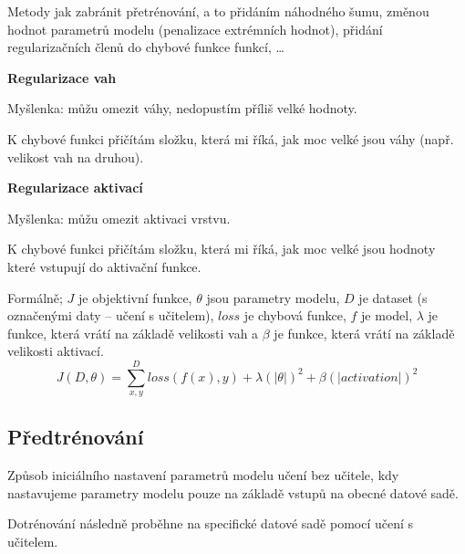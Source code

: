 \begin{compactitem}
    \item Metody jak zabránit přetrénování, a to přidáním náhodného šumu, změnou hodnot parametrů modelu (penalizace extrémních hodnot), přidání regularizačních členů do chybové funkce funkcí, \dots

    \item \textbf{Regularizace vah} \begin{compactitem}
        \item Myšlenka: můžu omezit váhy, nedopustím příliš velké hodnoty.
        \item K chybové funkci přičítám složku, která mi říká, jak moc velké jsou váhy (např. velikost vah na druhou).
    \end{compactitem}

    \item \textbf{Regularizace aktivací} \begin{compactitem}
        \item Myšlenka: můžu omezit aktivaci vrstvu.
        \item K chybové funkci přičítám složku, která mi říká, jak moc velké jsou hodnoty které vstupují do aktivační funkce.
    \end{compactitem}

    \item Formálně; $J$ je objektivní funkce, $\theta$ jsou parametry modelu, $D$ je dataset (s označenými daty -- učení s učitelem), $loss$ je chybová funkce, $f$ je model, $\lambda$ je funkce, která vrátí  na základě velikosti vah a $\beta$ je funkce, která vrátí  na základě velikosti aktivací.
    $$
        J(D, \theta) = \sum_{x, y}^D loss(f(x), y) + \lambda(|\theta|)^2 + \beta(|activation|)^2
    $$
\end{compactitem}

\subsection{Předtrénování}

\begin{compactitem}
    \item Způsob iniciálního nastavení parametrů modelu učení bez učitele, kdy nastavujeme parametry modelu pouze na základě vstupů na obecné datové sadě.

    \item Dotrénování následně proběhne na specifické datové sadě pomocí učení s učitelem.
\end{compactitem}

